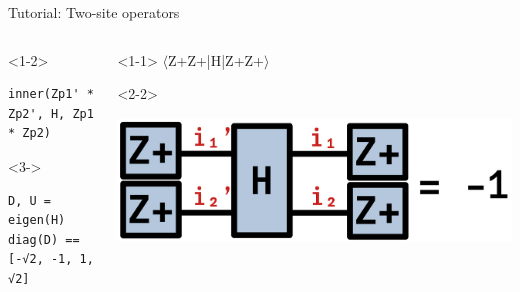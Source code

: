 \begin{frame}[fragile]{Tutorial: Two-site operators}

\begin{columns}

\begin{column}{5cm}

\begin{onlyenv}<1-2>
\begin{lstlisting}[language=JuliaLocal, style=julia, basicstyle=\scriptsize\ttfamily]
inner(Zp1' * Zp2', H, Zp1 * Zp2)

\end{lstlisting}
\end{onlyenv}

\begin{onlyenv}<3->
\begin{lstlisting}[language=JuliaLocal, style=julia, basicstyle=\scriptsize\ttfamily]
D, U = eigen(H)
diag(D) == [-√2, -1, 1, √2]
\end{lstlisting}
\end{onlyenv}

\end{column}

\begin{column}{5cm}

\begin{onlyenv}<1-1>
$\langle$Z+Z+|H|Z+Z+$\rangle$ \\
\end{onlyenv}

\begin{onlyenv}<2-2>
\vspace*{0.0cm}
\begin{center}
\includegraphics[width=1.0\textwidth]{
  slides/assets/Zp1Zp2HZp1Zp2.png
}
\end{center}
\vspace*{0.0cm}
\end{onlyenv}



\end{column}
\end{columns}
\end{frame}
